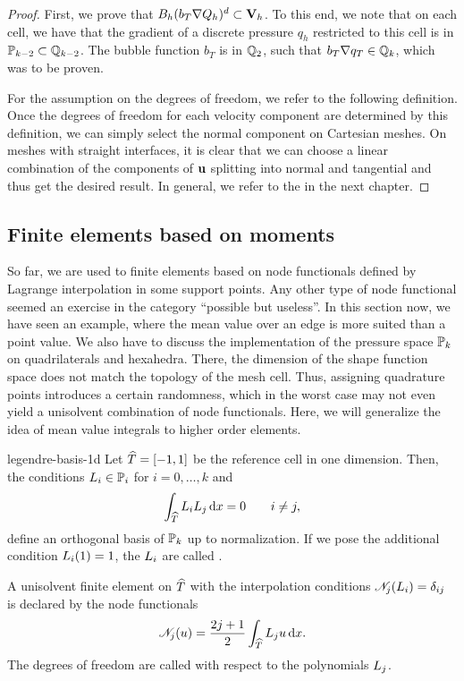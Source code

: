 \begin{proof}
  First, we prove that $B_h(b_\cell \nabla Q_h)^d \subset \vV_h$. To
  this end, we note that on each cell, we have that the gradient of
  a discrete pressure $q_h$ restricted to this cell is in
  $\P_{k-2}\subset \Q_{k-2}$. The bubble function $b_T$ is in $\Q_2$,
  such that $b_T\nabla q_T \in \Q_k$, which was to be proven.

  For the assumption on the degrees of freedom, we refer to the
  following definition. Once the degrees of freedom for each velocity
  component are determined by this definition, we can simply select
  the normal component on Cartesian meshes. On meshes with straight
  interfaces, it is clear that we can choose a linear combination of
  the components of $\vu$ splitting into normal and tangential and thus
  get the desired result. In general, we refer to the  in the next chapter.
\end{proof}

\subsection{Finite elements based on moments}

\begin{intro}
  So far, we are used to finite elements based on node functionals
  defined by Lagrange interpolation in some support points. Any other
  type of node functional seemed an exercise in the category
  ``possible but useless''. In this section now, we have seen an
  example, where the mean value over an edge is more suited than a
  point value. We also have to discuss the implementation of the
  pressure space $\P_k$ on quadrilaterals and hexahedra. There, the
  dimension of the shape function space does not match the topology of
  the mesh cell. Thus, assigning quadrature points introduces a
  certain randomness, which in the worst case may not even yield a
  unisolvent combination of node functionals. Here, we will generalize
  the idea of mean value integrals to higher order elements.
\end{intro}

\begin{Definition}{legendre-basis-1d}
  Let $\refcell = [-1,1]$ be the reference cell in one
  dimension. Then, the conditions $\plegendre_i \in \P_i$ for
  $i=0,\dots,k$ and
  \begin{gather}
      \int_{\refcell} \plegendre_i\plegendre_j\dx = 0 \qquad i\neq j,
  \end{gather}
  define an orthogonal basis of $\P_k$ up to normalization. If we pose
  the additional condition $\plegendre_i(1) = 1$, the $\plegendre_i$ are called
  .

  A unisolvent finite element on $\refcell$ with the interpolation
  conditions $\nodal_j(\plegendre_i) = \delta_{ij}$ is declared by the
  node functionals
  \begin{gather}
    \nodal_j(u) = \frac{2j+1}2 \int_{\refcell} \plegendre_j u \dx.
  \end{gather}
  The degrees of freedom are called  with respect to the polynomials $\plegendre_j$.
\end{Definition}

